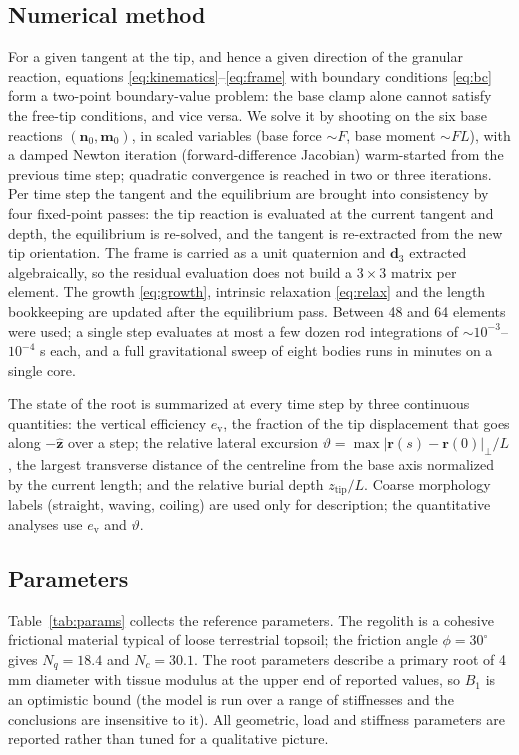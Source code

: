 \documentclass[preprint,12pt]{elsarticle}
\begin{document}
\subsection{Numerical method}
\label{sec:numerics}

For a given tangent at the tip, and hence a given direction of the granular
reaction, equations \eqref{eq:kinematics}--\eqref{eq:frame} with boundary
conditions \eqref{eq:bc} form a two-point boundary-value problem: the base
clamp alone cannot satisfy the free-tip conditions, and vice versa. We solve
it by shooting on the six base reactions $(\mathbf n_0,\mathbf m_0)$, in
scaled variables (base force $\sim F$, base moment $\sim FL$), with a
damped Newton iteration (forward-difference Jacobian) warm-started from the
previous time step; quadratic convergence is reached in two or three
iterations. Per time step the tangent and the equilibrium are brought into
consistency by four fixed-point passes: the tip reaction is evaluated at the
current tangent and depth, the equilibrium is re-solved, and the tangent is
re-extracted from the new tip orientation. The frame is carried as a unit
quaternion and $\mathbf d_3$ extracted algebraically, so the residual
evaluation does not build a $3\times3$ matrix per element. The growth
\eqref{eq:growth}, intrinsic relaxation \eqref{eq:relax} and the length
bookkeeping are updated after the equilibrium pass. Between 48 and 64
elements were used; a single step evaluates at most a few dozen rod
integrations of $\sim10^{-3}$--$10^{-4}$ s each, and a full gravitational
sweep of eight bodies runs in minutes on a single core.

The state of the root is summarized at every time step by three continuous
quantities: the vertical efficiency $e_\mathrm{v}$, the fraction of the tip
displacement that goes along $-\hat{\mathbf z}$ over a step; the relative
lateral excursion $\vartheta=\max|{\mathbf r(s)}-\mathbf r(0)|_{\perp}/L$, the
largest transverse distance of the centreline from the base axis normalized
by the current length; and the relative burial depth $z_{\mathrm{tip}}/L$.
Coarse morphology labels (straight, waving, coiling) are used only for
description; the quantitative analyses use $e_\mathrm{v}$ and $\vartheta$.

\subsection{Parameters}
\label{sec:params}

Table~\ref{tab:params} collects the reference parameters. The regolith is a
cohesive frictional material typical of loose terrestrial topsoil; the
friction angle $\phi=30^\circ$ gives $N_q=18.4$ and $N_c=30.1$. The root
parameters describe a primary root of 4 mm diameter with tissue modulus at
the upper end of reported values, so $B_1$ is an optimistic bound (the model
is run over a range of stiffnesses and the conclusions are insensitive to
it). All geometric, load and stiffness parameters are reported rather than
tuned for a qualitative picture.
\end{document}
